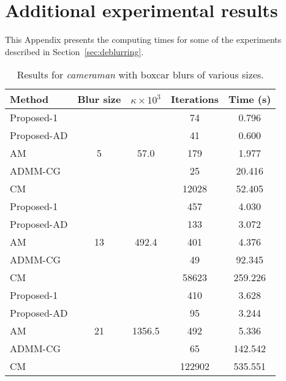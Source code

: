 \documentclass[10pt,twocolumn,twoside]{IEEEtran}
\begin{document}
\section{Additional experimental results}
\label{sec:app_exp}

This Appendix presents the computing times for some of the experiments described in \mbox{Section~\ref{sec:deblurring}}.

\begin{table}[h]
	\renewcommand{\arraystretch}{1}
	\caption{Results for \textit{cameraman} with boxcar blurs of various sizes.}
	\centering
\begin{tabular}{l|c|c|c|c}
Method &Blur size &$\kappa \times 10^3$ &Iterations &Time (s) \\
\hline
Proposed-1 & \multirow{5}{*}{5} & \multirow{5}{*}{57.0} &   74 & 0.796  \\
Proposed-AD & & &   41 & 0.600 \\
AM & & &  179 & 1.977 \\
ADMM-CG & & &   25 & 20.416 \\
CM & & & 12028 & 52.405 \\
\hline
Proposed-1 & \multirow{5}{*}{13} & \multirow{5}{*}{492.4} &  457 & 4.030  \\
Proposed-AD & & &  133 & 3.072 \\
AM & & &  401 & 4.376 \\
ADMM-CG & & &   49 & 92.345 \\
CM & & & 58623 & 259.226 \\
\hline
Proposed-1 & \multirow{5}{*}{21} & \multirow{5}{*}{1356.5} &  410 & 3.628  \\
Proposed-AD & & &   95 & 3.244 \\
AM & & &  492 & 5.336 \\
ADMM-CG & & &   65 & 142.542 \\
CM & & & 122902 & 535.551 \\
\hline
\end{tabular}
\end{table}
\end{document}
